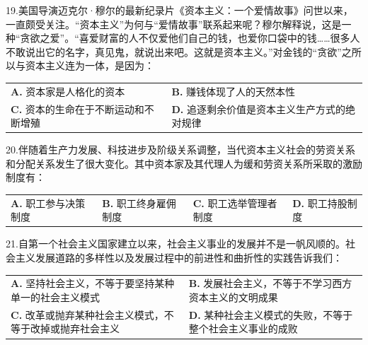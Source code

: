 \documentclass[UTF8,11pt]{ctexart}
\begin{document}
19.美国导演迈克尔·穆尔的最新纪录片《资本主义：一个爱情故事》问世以来，一直颇受关注。“资本主义”为何与“爱情故事”联系起来呢？穆尔解释说，这是一种“贪欲之爱”。“喜爱财富的人不仅爱他们自己的钱，也爱你口袋中的钱……很多人不敢说出它的名字，真见鬼，就说出来吧。这就是资本主义。”对金钱的“贪欲”之所以与资本主义连为一体，是因为：


\begin{center}\begin{tabular}{>{\raggedright\arraybackslash}p{\dimexpr(\linewidth-4\tabcolsep)/2\relax}>{\raggedright\arraybackslash}p{\dimexpr(\linewidth-4\tabcolsep)/2\relax}}
\textbf{A.} 资本家是人格化的资本 & \textbf{B.} 赚钱体现了人的天然本性\\[.35em]
\textbf{C.} 资本的生命在于不断运动和不断增殖 & \textbf{D.} 追逐剩余价值是资本主义生产方式的绝对规律\\[.35em]\end{tabular}\end{center}

20.伴随着生产力发展、科技进步及阶级关系调整，当代资本主义社会的劳资关系和分配关系发生了很大变化。其中资本家及其代理人为缓和劳资关系所采取的激励制度有：


\begin{center}\begin{tabular}{>{\raggedright\arraybackslash}p{\dimexpr(\linewidth-8\tabcolsep)/4\relax}>{\raggedright\arraybackslash}p{\dimexpr(\linewidth-8\tabcolsep)/4\relax}>{\raggedright\arraybackslash}p{\dimexpr(\linewidth-8\tabcolsep)/4\relax}>{\raggedright\arraybackslash}p{\dimexpr(\linewidth-8\tabcolsep)/4\relax}}
\textbf{A.} 职工参与决策制度 & \textbf{B.} 职工终身雇佣制度 & \textbf{C.} 职工选举管理者制度 & \textbf{D.} 职工持股制度\\[.35em]\end{tabular}\end{center}

21.自第一个社会主义国家建立以来，社会主义事业的发展并不是一帆风顺的。社会主义发展道路的多样性以及发展过程中的前进性和曲折性的实践告诉我们：


\begin{center}\begin{tabular}{>{\raggedright\arraybackslash}p{\dimexpr(\linewidth-4\tabcolsep)/2\relax}>{\raggedright\arraybackslash}p{\dimexpr(\linewidth-4\tabcolsep)/2\relax}}
\textbf{A.} 坚持社会主义，不等于要坚持某种单一的社会主义模式 & \textbf{B.} 发展社会主义，不等于不学习西方资本主义的文明成果\\[.35em]
\textbf{C.} 改革或抛弃某种社会主义模式，不等于改掉或抛弃社会主义 & \textbf{D.} 某种社会主义模式的失败，不等于整个社会主义事业的成败\\[.35em]\end{tabular}\end{center}
\end{document}
